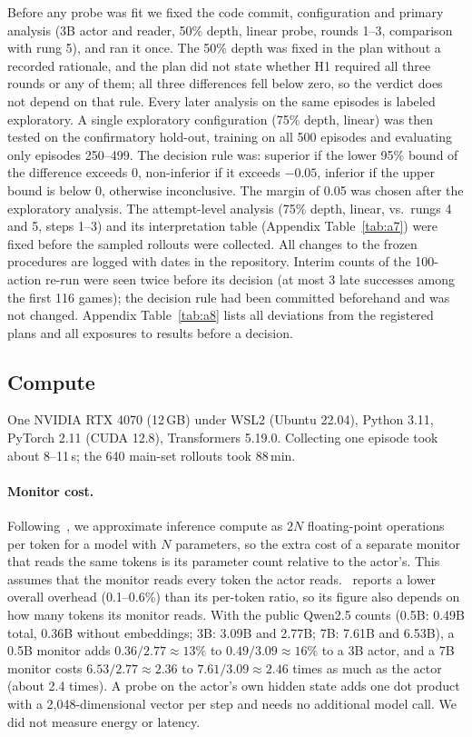 \documentclass[11pt]{article}
\begin{document}
Before any probe was fit we fixed the code commit, configuration and primary analysis (3B actor and reader, 50\% depth, linear probe, rounds 1--3, comparison with rung 5),
and ran it once. The 50\% depth was fixed in the plan without a recorded rationale, and the plan did not state whether H1 required all three rounds or any of them; all three differences fell below zero, so the verdict does not depend on that rule. Every later analysis on the same episodes is labeled exploratory. A single exploratory configuration (75\% depth, linear) was then tested on the confirmatory
hold-out, training on all 500 episodes and evaluating only episodes 250--499. The decision rule was: superior if the lower 95\% bound of the difference exceeds 0,
non-inferior if it exceeds $-0.05$, inferior if the upper bound is below 0, otherwise inconclusive. The margin of 0.05 was chosen after the exploratory analysis.
The attempt-level analysis (75\% depth, linear, vs.\ rungs 4 and 5, steps 1--3) and its interpretation table (Appendix Table~\ref{tab:a7}) were fixed before the sampled rollouts were collected.
All changes to the frozen procedures are logged with dates in the repository.
Interim counts of the 100-action re-run were seen twice before its decision (at most 3 late successes among the first 116 games); the decision rule had been committed beforehand and was not changed. Appendix Table~\ref{tab:a8} lists all deviations from the registered plans and all exposures to results before a decision.

\subsection{Compute}
One NVIDIA RTX 4070 (12\,GB) under WSL2 (Ubuntu 22.04), Python 3.11, PyTorch 2.11 (CUDA 12.8), Transformers 5.19.0.
Collecting one episode took about 8--11\,s; the 640 main-set rollouts took 88\,min.

\paragraph{Monitor cost.} Following~\cite{wang2026failfast}, we approximate inference compute as $2N$ floating-point operations per token for a model with $N$ parameters, so the extra cost of a separate monitor that reads the same tokens is its parameter count relative to the actor's. This assumes that the monitor reads every token the actor reads.~\cite{wang2026failfast} reports a lower overall overhead (0.1--0.6\%) than its per-token ratio, so its figure also depends on how many tokens its monitor reads.
With the public Qwen2.5 counts (0.5B: 0.49B total, 0.36B without embeddings; 3B: 3.09B and 2.77B; 7B: 7.61B and 6.53B), a 0.5B monitor adds $0.36/2.77 \approx 13\%$ to $0.49/3.09 \approx 16\%$ to a 3B actor,
and a 7B monitor costs $6.53/2.77 \approx 2.36$ to $7.61/3.09 \approx 2.46$ times as much as the actor (about 2.4 times). A probe on the actor's own hidden state adds one dot product with a 2,048-dimensional vector per step and needs no additional model call.
We did not measure energy or latency.
\end{document}
